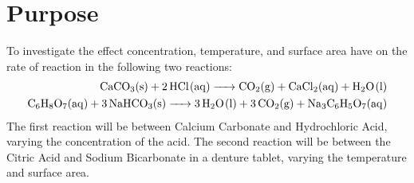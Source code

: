 
\section{Purpose}
To investigate the effect concentration, temperature, and surface area have on the rate of reaction in the following two reactions:
\begin{align*}
    \reactionOne \\
    \reactionTwo
\end{align*}
The first reaction will be between Calcium Carbonate and Hydrochloric Acid, varying the concentration of the acid. The second reaction will be between the Citric Acid and Sodium Bicarbonate in a denture tablet, varying the temperature and surface area.

